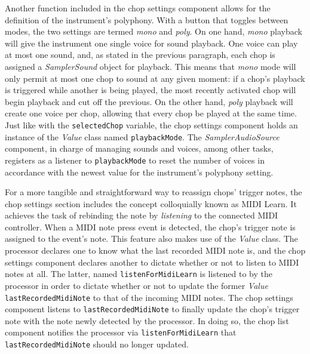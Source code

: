 \documentclass[12pt, a4paper, hidelinks]{article}
\begin{document}
	Another function included in the chop settings component allows for the definition of the instrument's polyphony. With a button that toggles between modes, the two settings are termed \textit{mono} and \textit{poly}. On one hand, \textit{mono} playback will give the instrument one single voice for sound playback. One voice can play at most one sound, and, as stated in the previous paragraph, each chop is assigned a \textit{SamplerSound} object for playback. This means that \textit{mono} mode will only permit at most one chop to sound at any given moment: if a chop's playback is triggered while another is being played, the most recently activated chop will begin playback and cut off the previous. On the other hand, \textit{poly} playback will create one voice per chop, allowing that every chop be played at the same time. Just like with the \texttt{selectedChop} variable, the chop settings component holds an instance of the \textit{Value} class named \texttt{playbackMode}. The \textit{SamplerAudioSource} component, in charge of managing sounds and voices, among other tasks, registers as a listener to \texttt{playbackMode} to reset the number of voices in accordance with the newest value for the instrument's polyphony setting.\par
	
	For a more tangible and straightforward way to reassign chops' trigger notes, the chop settings section includes the concept colloquially known as MIDI Learn. It achieves the task of rebinding the note by \textit{listening} to the connected MIDI controller. When a MIDI note press event is detected, the chop's trigger note is assigned to the event's note. This feature also makes use of the \textit{Value} class.  The processor declares one to know what the last recorded MIDI note is, and the chop settings component declares another to dictate whether or not to listen to MIDI notes at all. The latter, named \texttt{listenForMidiLearn} is listened to by the processor in order to dictate whether or not to update the former \textit{Value} \texttt{lastRecordedMidiNote} to that of the incoming MIDI notes. The chop settings component listens to \texttt{lastRecordedMidiNote} to finally update the chop's trigger note with the note newly detected by the processor. In doing so, the chop list component notifies the processor via \texttt{listenForMidiLearn} that \texttt{lastRecordedMidiNote} should no longer updated.
	
	
	
	\newpage
\end{document}
